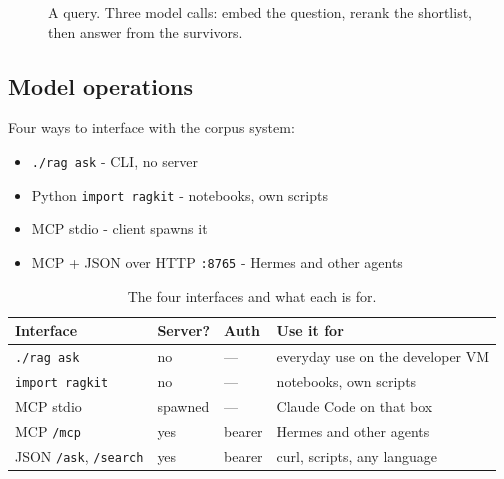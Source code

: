 \documentclass[11pt,a4paper]{article}
\newcommand{\cmd}[1]{\texttt{\small #1}}
\begin{document}
\begin{figure}[!ht]
{}
  \caption{A query. Three model calls: embed the question, rerank the
           shortlist, then answer from the survivors.}
  \label{fig:corpus-query}
\end{figure}

\subsection{Model operations}

Four ways to interface with the corpus system:
\begin{itemize}
  \item \cmd{./rag ask} - CLI, no server
  \item Python \cmd{import ragkit} - notebooks, own scripts
  \item MCP stdio - client spawns it
  \item MCP + JSON over HTTP \cmd{:8765} - Hermes and other agents
\end{itemize}

\begin{table}[!ht]
  \centering
  \renewcommand{\arraystretch}{1.25}
  \begin{tabularx}{\linewidth}{@{}l l l X@{}}
    \toprule
    \textbf{Interface} & \textbf{Server?} & \textbf{Auth} & \textbf{Use it for} \\\midrule
    \cmd{./rag ask}              & no      & ---    & everyday use on the developer VM \\\midrule
    \cmd{import ragkit}          & no      & ---    & notebooks, own scripts \\\midrule
    MCP stdio                    & spawned & ---    & Claude Code on that box \\\midrule
    MCP \cmd{/mcp}               & yes     & bearer & Hermes and other agents \\\midrule
    JSON \cmd{/ask}, \cmd{/search} & yes   & bearer & curl, scripts, any language \\\bottomrule
  \end{tabularx}
  \caption{The four interfaces and what each is for.}
  \label{tab:corpus-interfaces}
\end{table}
\end{document}
